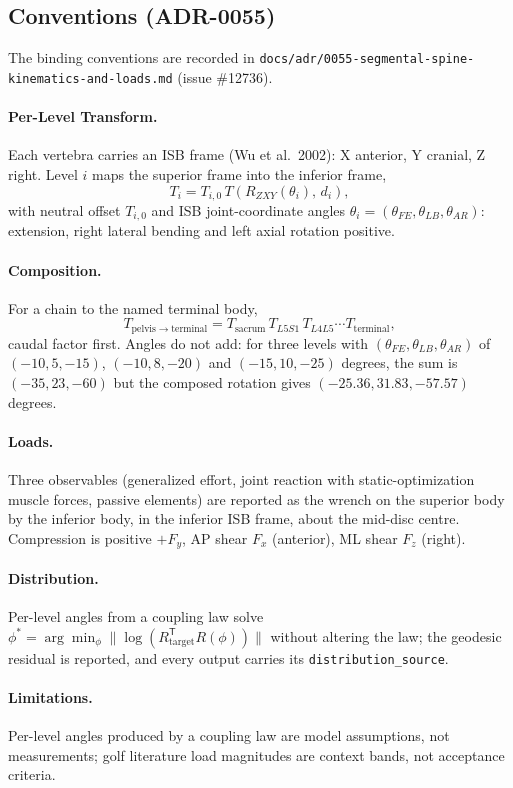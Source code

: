 \subsection{Conventions (ADR-0055)}
\label{sec:spn-0}

The binding conventions are recorded in
\texttt{docs/adr/0055-segmental-spine-kinematics-and-loads.md} (issue \#12736).

\paragraph{Per-Level Transform.} Each vertebra carries an ISB frame (Wu et al.\
2002): X anterior, Y cranial, Z right. Level $i$ maps the superior frame into the
inferior frame,
\begin{equation}
  T_i = T_{i,0}\, T\!\left(R_{ZXY}(\theta_i),\, d_i\right),
\end{equation}
with neutral offset $T_{i,0}$ and ISB joint-coordinate angles
$\theta_i = (\theta_{FE}, \theta_{LB}, \theta_{AR})$: extension, right lateral
bending and left axial rotation positive.

\paragraph{Composition.} For a chain to the named terminal body,
\begin{equation}
  T_{\mathrm{pelvis}\to\mathrm{terminal}} = T_{\mathrm{sacrum}}\, T_{L5S1}\, T_{L4L5} \cdots T_{\mathrm{terminal}},
\end{equation}
caudal factor first. Angles do not add: for three levels with
$(\theta_{FE},\theta_{LB},\theta_{AR})$ of $(-10,5,-15)$, $(-10,8,-20)$ and
$(-15,10,-25)$ degrees, the sum is $(-35, 23, -60)$ but the composed rotation
gives $(-25.36, 31.83, -57.57)$ degrees.

\paragraph{Loads.} Three observables (generalized effort, joint reaction with
static-optimization muscle forces, passive elements) are reported as the wrench
on the superior body by the inferior body, in the inferior ISB frame, about the
mid-disc centre. Compression is positive $+F_y$, AP shear $F_x$ (anterior),
ML shear $F_z$ (right).

\paragraph{Distribution.} Per-level angles from a coupling law solve
$\phi^\ast = \arg\min_\phi \lVert \log(R_{\mathrm{target}}^{\mathsf T} R(\phi))\rVert$
without altering the law; the geodesic residual is reported, and every output
carries its \texttt{distribution\_source}.

\paragraph{Limitations.} Per-level angles produced by a coupling law are model
assumptions, not measurements; golf literature load magnitudes are context
bands, not acceptance criteria.
